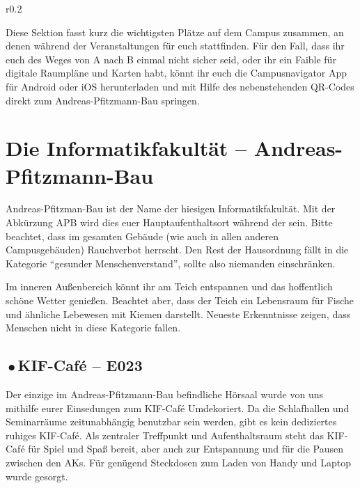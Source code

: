
\begin{wrapfigure}{r}{0.2\textwidth}
  \vspace*{-11pt}
  \textcolor{KIFgrey}{}
\end{wrapfigure}

Diese Sektion fasst kurz die wichtigsten Plätze auf dem Campus zusammen, an denen während der \KIF{} Veranstaltungen für euch stattfinden.
Für den Fall, dass ihr euch des Weges von A nach B einmal nicht sicher seid, oder ihr ein Faible für digitale Raumpläne und Karten habt, könnt ihr euch die Campusnavigator App für Android  oder iOS  herunterladen und mit Hilfe des nebenstehenden QR-Codes direkt zum Andreas-Pfitzmann-Bau springen.

\section*{Die Informatikfakultät -- Andreas-Pfitzmann-Bau}
Andreas-Pfitzman-Bau ist der Name der hiesigen Informatikfakultät. Mit der Abkürzung APB wird dies euer Hauptaufenthaltsort während der \KIF{} sein.
Bitte beachtet, dass im gesamten Gebäude (wie auch in allen anderen Campusgebäuden) Rauchverbot herrscht.
Den Rest der Hausordnung fällt in die Kategorie \enquote{gesunder Menschenverstand}, sollte also niemanden einschränken.

Im inneren Außenbereich könnt ihr am Teich entspannen und das hoffentlich schöne Wetter genießen.
Beachtet aber, dass der Teich ein Lebensraum für Fische und ähnliche Lebewesen mit Kiemen darstellt.
Neueste Erkenntnisse zeigen, dass Menschen nicht in diese Kategorie fallen.


\subsection*{{\,\color{ShirtAttendee}$\bullet$\,}KIF-Café -- E023}
Der einzige im Andreas-Pfitzmann-Bau befindliche Hörsaal wurde von uns mithilfe eurer Einsedungen zum KIF-Café Umdekoriert.
Da die Schlafhallen und Seminarräume zeitunabhängig benutzbar sein werden, gibt es kein dediziertes ruhiges KIF-Café.
Als zentraler Treffpunkt und Aufenthaltsraum steht das KIF-Café für Spiel und Spaß bereit, aber auch zur Entspannung und für die Pausen zwischen den AKs.
Für genügend Steckdosen zum Laden von Handy und Laptop wurde gesorgt.

